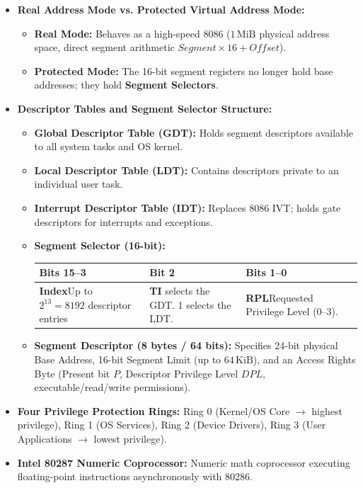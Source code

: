 \documentclass[12pt,a4paper]{article}
\begin{document}
\begin{itemize}[leftmargin=*]
  \item \textbf{Real Address Mode vs. Protected Virtual Address Mode:}
  \begin{itemize}[leftmargin=*]
    \item \textbf{Real Mode:} Behaves as a high-speed 8086 ($1\,\mathrm{MiB}$ physical address space, direct segment arithmetic $Segment \times 16 + Offset$).
    \item \textbf{Protected Mode:} The 16-bit segment registers no longer hold base addresses; they hold \textbf{Segment Selectors}.
  \end{itemize}
  \item \textbf{Descriptor Tables and Segment Selector Structure:}
  \begin{itemize}[leftmargin=*]
    \item \textbf{Global Descriptor Table (GDT):} Holds segment descriptors available to all system tasks and OS kernel.
    \item \textbf{Local Descriptor Table (LDT):} Contains descriptors private to an individual user task.
    \item \textbf{Interrupt Descriptor Table (IDT):} Replaces 8086 IVT; holds gate descriptors for interrupts and exceptions.
    \item \textbf{Segment Selector (16-bit):}
    \par\vspace{3pt}
    \centering
    \begin{tabularx}{\linewidth}{|Y|Y|Y|}
    \hline
    \textbf{Bits 15--3} & \textbf{Bit 2} & \textbf{Bits 1--0} \\ \hline
    \textbf{Index}\newline Up to $2^{13}=8192$ descriptor entries &
    \textbf{TI} selects the GDT. 1 selects the LDT. &
    \textbf{RPL}\newline Requested Privilege Level (0--3). \\ \hline
    \end{tabularx}
    \par\vspace{3pt}\raggedright
    \item \textbf{Segment Descriptor (8 bytes / 64 bits):} Specifies 24-bit physical Base Address, 16-bit Segment Limit (up to $64\,\mathrm{KiB}$), and an Access Rights Byte (Present bit $P$, Descriptor Privilege Level $DPL$, executable/read/write permissions).
  \end{itemize}
  \item \textbf{Four Privilege Protection Rings:} Ring 0 (Kernel/OS Core $\to$ highest privilege), Ring 1 (OS Services), Ring 2 (Device Drivers), Ring 3 (User Applications $\to$ lowest privilege).
  \item \textbf{Intel 80287 Numeric Coprocessor:} Numeric math coprocessor executing floating-point instructions asynchronously with 80286.
\end{itemize}
\end{document}
